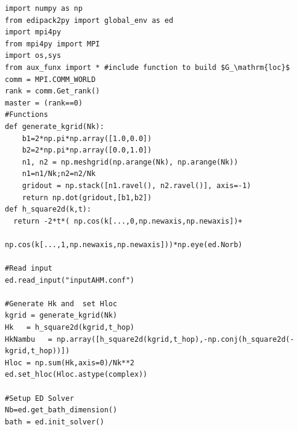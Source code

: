 \documentclass[edipack_sp.tex]{subfiles}
\begin{document}
\begin{lstlisting}[style=mypython,numbers=none,basicstyle={\scriptsize\ttfamily}]
import numpy as np
from edipack2py import global_env as ed
import mpi4py
from mpi4py import MPI
import os,sys
from aux_funx import * #include function to build $G_\mathrm{loc}$ 
comm = MPI.COMM_WORLD
rank = comm.Get_rank()
master = (rank==0)
#Functions
def generate_kgrid(Nk):
    b1=2*np.pi*np.array([1.0,0.0])
    b2=2*np.pi*np.array([0.0,1.0])
    n1, n2 = np.meshgrid(np.arange(Nk), np.arange(Nk))
    n1=n1/Nk;n2=n2/Nk
    gridout = np.stack([n1.ravel(), n2.ravel()], axis=-1)
    return np.dot(gridout,[b1,b2])
def h_square2d(k,t):
  return -2*t*( np.cos(k[...,0,np.newaxis,np.newaxis])+
                np.cos(k[...,1,np.newaxis,np.newaxis]))*np.eye(ed.Norb)
    
#Read input
ed.read_input("inputAHM.conf")

#Generate Hk and  set Hloc
kgrid = generate_kgrid(Nk)
Hk   = h_square2d(kgrid,t_hop)
HkNambu   = np.array([h_square2d(kgrid,t_hop),-np.conj(h_square2d(-kgrid,t_hop))])
Hloc = np.sum(Hk,axis=0)/Nk**2
ed.set_hloc(Hloc.astype(complex))

#Setup ED Solver
Nb=ed.get_bath_dimension()
bath = ed.init_solver()
\end{lstlisting}
\end{document}
